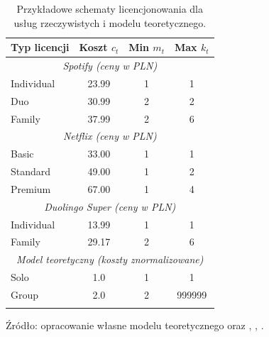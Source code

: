 \begin{table}[h!]
  \centering
  \caption{Przykładowe schematy licencjonowania dla usług rzeczywistych i modelu teoretycznego.}
  \begin{tabular}{lccc}
    \hline
    \textbf{Typ licencji} & \textbf{Koszt $c_t$} & \textbf{Min $m_t$} & \textbf{Max $k_t$} \\
    \hline
    \multicolumn{4}{c}{\textit{Spotify (ceny w PLN)}}                                      \\
    Individual            & 23.99                & 1                  & 1                  \\
    Duo                   & 30.99                & 2                  & 2                  \\
    Family                & 37.99                & 2                  & 6                  \\
    \hline
    \multicolumn{4}{c}{\textit{Netflix (ceny w PLN)}}                                      \\
    Basic                 & 33.00                & 1                  & 1                  \\
    Standard              & 49.00                & 1                  & 2                  \\
    Premium               & 67.00                & 1                  & 4                  \\
    \hline
    \multicolumn{4}{c}{\textit{Duolingo Super (ceny w PLN)}}                               \\
    Individual            & 13.99                & 1                  & 1                  \\
    Family                & 29.17                & 2                  & 6                  \\
    \hline
    \multicolumn{4}{c}{\textit{Model teoretyczny (koszty znormalizowane)}}                 \\
    Solo                  & 1.0                  & 1                  & 1                  \\
    Group                 & 2.0                  & 2                  & 999999             \\
    \hline
    \label{tab:license_models_real}
  \end{tabular}

  Źródło: opracowanie własne modelu teoretycznego oraz \cite{spotify_price2024}, \cite{spotify_price2025}, \cite{duolingo_app2024}.

\end{table}


